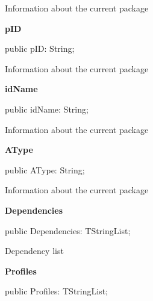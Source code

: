 \documentclass{report}
\newif\ifpdf
\begin{document}
\begin{list}{}
\begin{flushleft}
\ifpdf
\end{flushleft}
\fi


\par Information about the current package\label{igobase.TIWizFrm-pID}
\item[\textbf{pID}\hfill]
\ifpdf
\begin{flushleft}
\fi
\begin{ttfamily}
public pID: String;\end{ttfamily}

\ifpdf
\end{flushleft}
\fi


\par Information about the current package\label{igobase.TIWizFrm-idName}
\item[\textbf{idName}\hfill]
\ifpdf
\begin{flushleft}
\fi
\begin{ttfamily}
public idName: String;\end{ttfamily}

\ifpdf
\end{flushleft}
\fi


\par Information about the current package\label{igobase.TIWizFrm-AType}
\item[\textbf{AType}\hfill]
\ifpdf
\begin{flushleft}
\fi
\begin{ttfamily}
public AType: String;\end{ttfamily}

\ifpdf
\end{flushleft}
\fi


\par Information about the current package\label{igobase.TIWizFrm-Dependencies}
\item[\textbf{Dependencies}\hfill]
\ifpdf
\begin{flushleft}
\fi
\begin{ttfamily}
public Dependencies: TStringList;\end{ttfamily}

\ifpdf
\end{flushleft}
\fi


\par Dependency list\label{igobase.TIWizFrm-Profiles}
\item[\textbf{Profiles}\hfill]
\ifpdf
\begin{flushleft}
\fi
\begin{ttfamily}
public Profiles: TStringList;\end{ttfamily}


\end{flushleft}
\end{list}
\end{document}
